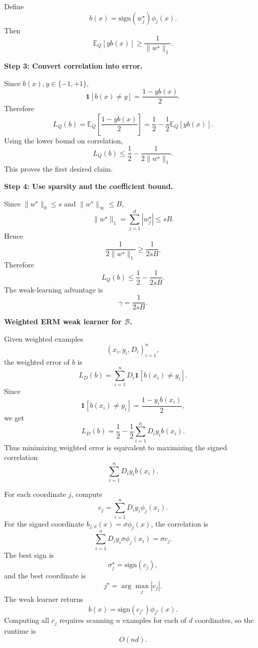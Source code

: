 \documentclass[11pt]{article}
\newcommand{\E}{\mathbb{E}}
\newcommand{\sign}{\mathrm{sign}}
\newcommand{\ind}{\mathbf{1}}
\begin{document}
\begin{enumerate}
\begin{solutionbox}
    Define
    \[
    b(x)=\sign(w_j^\star)\phi_j(x).
    \]
    Then
    \[
    \E_Q[yb(x)]\ge \frac{1}{\|w^\star\|_1}.
    \]

    \medskip

    \textbf{Step 3: Convert correlation into error.}

    Since $b(x),y\in\{-1,+1\}$,
    \[
    \ind[b(x)\ne y]=\frac{1-yb(x)}{2}.
    \]
    Therefore
    \[
    L_Q(b)
    =
    \E_Q\left[\frac{1-yb(x)}{2}\right]
    =
    \frac12-\frac12\E_Q[yb(x)].
    \]
    Using the lower bound on correlation,
    \[
    L_Q(b)
    \le
    \frac12-\frac{1}{2\|w^\star\|_1}.
    \]
    This proves the first desired claim.

    \medskip

    \textbf{Step 4: Use sparsity and the coefficient bound.}

    Since $\|w^\star\|_0\le s$ and $\|w^\star\|_\infty\le B$,
    \[
    \|w^\star\|_1
    =
    \sum_{j=1}^d |w_j^\star|
    \le
    sB.
    \]
    Hence
    \[
    \frac{1}{2\|w^\star\|_1}
    \ge
    \frac{1}{2sB}.
    \]
    Therefore
    \[
    L_Q(b)
    \le
    \frac12-\frac{1}{2sB}.
    \]
    The weak-learning advantage is
    \[
    \boxed{\gamma=\frac{1}{2sB}.}
    \]

    \medskip

    \textbf{Weighted ERM weak learner for $\mathcal B$.}

    Given weighted examples
    \[
    (x_i,y_i,D_i)_{i=1}^n,
    \]
    the weighted error of $b$ is
    \[
    L_D(b)=\sum_{i=1}^nD_i\ind[b(x_i)\ne y_i].
    \]
    Since
    \[
    \ind[b(x_i)\ne y_i]=\frac{1-y_i b(x_i)}{2},
    \]
    we get
    \[
    L_D(b)
    =
    \frac12-\frac12\sum_{i=1}^nD_i y_i b(x_i).
    \]
    Thus minimizing weighted error is equivalent to maximizing the signed correlation
    \[
    \sum_{i=1}^nD_i y_i b(x_i).
    \]

    For each coordinate $j$, compute
    \[
    c_j=\sum_{i=1}^nD_i y_i\phi_j(x_i).
    \]
    For the signed coordinate $b_{j,\sigma}(x)=\sigma\phi_j(x)$, the correlation is
    \[
    \sum_{i=1}^nD_i y_i\sigma\phi_j(x_i)=\sigma c_j.
    \]
    The best sign is
    \[
    \sigma_j^\star=\sign(c_j),
    \]
    and the best coordinate is
    \[
    j^\star=\arg\max_j |c_j|.
    \]
    The weak learner returns
    \[
    \boxed{
    b(x)=\sign(c_{j^\star})\phi_{j^\star}(x).
    }
    \]
    Computing all $c_j$ requires scanning $n$ examples for each of $d$ coordinates, so the runtime is
    \[
    \boxed{O(nd).}
    \]
    \end{solutionbox}


\end{enumerate}
\end{document}
